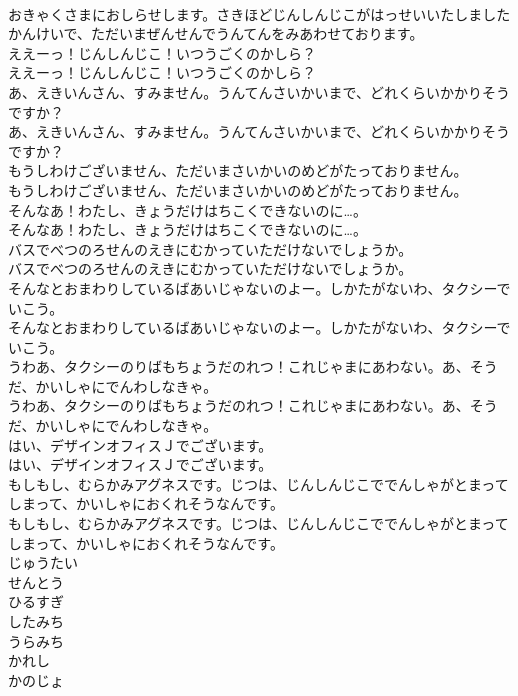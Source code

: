 \documentclass[8pt]{extreport}
\begin{document}
\begin{CJK}{UTF8}{min}
\\	おきゃくさまにおしらせします。さきほどじんしんじこがはっせいいたしましたかんけいで、ただいまぜんせんでうんてんをみあわせております。 
\\	ええーっ！じんしんじこ！いつうごくのかしら？	
\\	ええーっ！じんしんじこ！いつうごくのかしら？ 
\\	あ、えきいんさん、すみません。うんてんさいかいまで、どれくらいかかりそうですか？	
\\	あ、えきいんさん、すみません。うんてんさいかいまで、どれくらいかかりそうですか？ 
\\	もうしわけございません、ただいまさいかいのめどがたっておりません。	
\\	もうしわけございません、ただいまさいかいのめどがたっておりません。 
\\	そんなあ！わたし、きょうだけはちこくできないのに…。	
\\	そんなあ！わたし、きょうだけはちこくできないのに…。 
\\	バスでべつのろせんのえきにむかっていただけないでしょうか。	
\\	バスでべつのろせんのえきにむかっていただけないでしょうか。 
\\	そんなとおまわりしているばあいじゃないのよー。しかたがないわ、タクシーでいこう。	
\\	そんなとおまわりしているばあいじゃないのよー。しかたがないわ、タクシーでいこう。 
\\	うわあ、タクシーのりばもちょうだのれつ！これじゃまにあわない。あ、そうだ、かいしゃにでんわしなきゃ。	
\\	うわあ、タクシーのりばもちょうだのれつ！これじゃまにあわない。あ、そうだ、かいしゃにでんわしなきゃ。 
\\	はい、デザインオフィスＪでございます。	
\\	はい、デザインオフィスＪでございます。 
\\	もしもし、むらかみアグネスです。じつは、じんしんじこででんしゃがとまってしまって、かいしゃにおくれそうなんです。	
\\	もしもし、むらかみアグネスです。じつは、じんしんじこででんしゃがとまってしまって、かいしゃにおくれそうなんです。 
\\	じゅうたい
\\	せんとう
\\	ひるすぎ
\\	したみち
\\	うらみち
\\	かれし
\\	かのじょ

\end{CJK}
\end{document}
